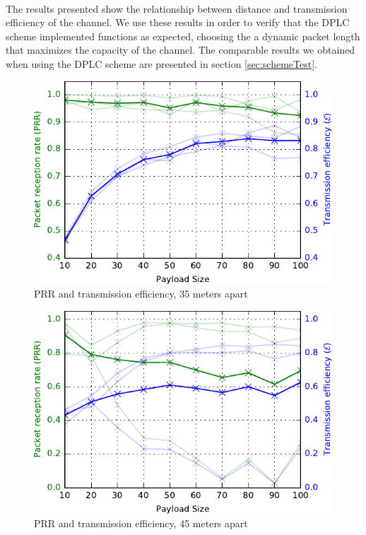 \paragraph{} The results presented show the relationship between distance and transmission efficiency of the channel. We use these results in order to verify that the DPLC scheme implemented functions as expected, choosing the a dynamic packet length that maximizes the capacity of the channel. The comparable results we obtained when using the DPLC scheme are presented in section \ref{sec:schemeTest}.

\begin{figure}
\centering
\includegraphics[scale=1]{figs/35mTest.pdf} 
\caption{PRR and transmission efficiency, 35 meters apart\label{fig:35mTest}}
\end{figure}

\begin{figure}
\centering
\includegraphics[scale=1]{figs/45mTest.pdf} 
\caption{PRR and transmission efficiency, 45 meters apart\label{fig:45mTest}}
\end{figure}